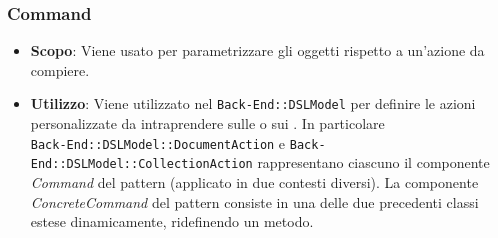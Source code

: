 \subsubsection{Command}

\begin{itemize}

	\item \textbf{Scopo}: Viene usato per parametrizzare gli oggetti rispetto a un'azione da compiere.
	\item \textbf{Utilizzo}: Viene utilizzato nel  \texttt{Back-End::DSLModel} per definire le azioni personalizzate da intraprendere sulle  o sui . In particolare \\ \texttt{Back-End::DSLModel::DocumentAction} e \texttt{Back-End::DSLModel::CollectionAction} rappresentano ciascuno il componente \textit{Command} del pattern (applicato in due contesti diversi). La componente \textit{ConcreteCommand} del pattern consiste in una delle due precedenti classi estese dinamicamente, ridefinendo un metodo.

\end{itemize}